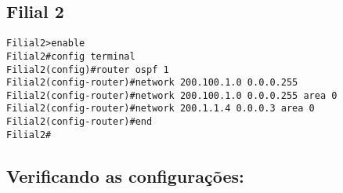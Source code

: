 \documentclass[]{article}
\begin{document}
\hypertarget{filial-2}{%
\subsection{Filial 2}\label{filial-2}}

\begin{verbatim}
Filial2>enable
Filial2#config terminal
Filial2(config)#router ospf 1
Filial2(config-router)#network 200.100.1.0 0.0.0.255
Filial2(config-router)#network 200.100.1.0 0.0.0.255 area 0
Filial2(config-router)#network 200.1.1.4 0.0.0.3 area 0
Filial2(config-router)#end
Filial2#
\end{verbatim}

\hypertarget{verificando-as-configurauxe7uxf5es}{%
\subsection{Verificando as
configurações:}\label{verificando-as-configurauxe7uxf5es}}
\end{document}

